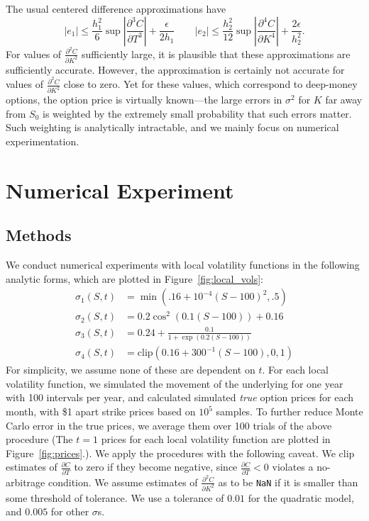 \documentclass[11pt]{article}
\numberwithin{equation}{section}
\newcommand{\diff}[2]{\frac{\partial #1}{\partial #2}}
\newcommand{\abs}[1]{\left|#1\right|}
\begin{document}
The usual centered difference approximations have
\[
|e_1|\le \frac{h_1^2}{6}\sup \abs{\diff{^3C}{T^3}} + \frac{\epsilon}{2h_1}
\qquad |e_2| \le \frac{h_2^2}{12}\sup \abs{\diff{^4C}{K^4}} +
\frac{2\epsilon}{h_2^2}.
\]
For values of $\diff{^2C}{K^2}$ sufficiently large, it is plausible that these
approximations are sufficiently accurate. However, the approximation is
certainly not accurate for values of $\diff{^2C}{K^2}$ close to zero. Yet for
these values, which correspond to deep-money options, the option price is
virtually known---the large errors in $\sigma^2$ for $K$ far away from $S_0$ is
weighted by the extremely small probability that such errors matter. Such
weighting is analytically intractable, and we mainly focus on numerical
experimentation. 
 
 
\section{Numerical Experiment}
\label{sec:numericalexp}

\subsection{Methods}
We conduct numerical experiments with local volatility functions in the
following analytic forms, which are plotted in Figure~\ref{fig:local_vols}:
\begin{align*}
\sigma_1(S,t) &= \min(.16 + 10^{-4}(S-100)^2, .5) \tag{Quadratic}\\
\sigma_2(S,t) &= 0.2\cos^2(0.1(S-100)) + 0.16 \tag{Sinusoidal}\\
\sigma_3(S,t) &= 0.24 + \frac{0.1}{1+\exp(0.2(S-100))} \tag{Logistic} \\
\sigma_4(S,t) &= \text{clip}(0.16 + 300^{-1}(S - 100),0,1) \tag{Linear}
\end{align*}
For simplicity, we assume none of these are dependent on $t$. For each local
volatility function, we simulated the movement of the underlying for one year
with 100 intervals per year, and calculated simulated \emph{true} option prices
for each month, with \$1 apart strike prices based on $10^5$ samples. To further
reduce Monte Carlo error in the true prices, we average them over 100 trials of
the above procedure (The $t=1$ prices for each local volatility function are
plotted in Figure~\ref{fig:prices}.). We apply the procedures with the following
caveat. We clip estimates of $\diff{C}{T}$ to zero if they become negative,
since $\diff{C}{T} < 0$ violates a no-arbitrage condition. We assume estimates
of $\diff{^2C}{K^2}$ as to be \texttt{NaN} if it is smaller than some threshold
of tolerance. We use a tolerance of $0.01$ for the quadratic model, and $0.005$
for other $\sigma$s. 
 
\end{document}
